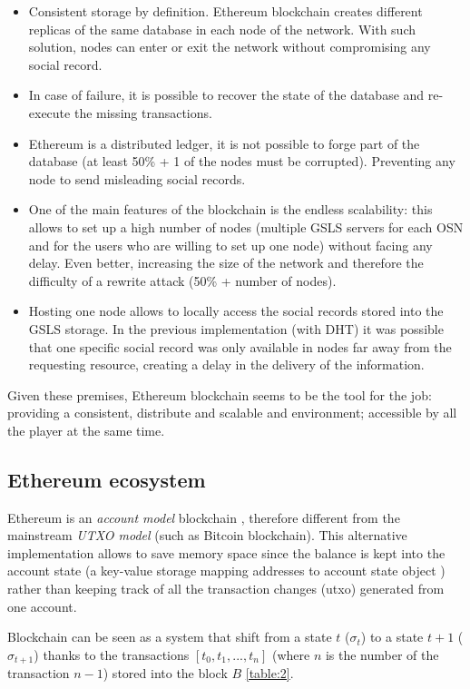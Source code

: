 \begin{itemize}
  \item Consistent storage by definition. Ethereum blockchain creates different replicas of the same database in each node of the network. With such solution, nodes can enter or exit the network without compromising any social record.
  \item In case of failure, it is possible to recover the state of the database and re-execute the missing transactions.
  \item Ethereum is a distributed ledger, it is not possible to forge part of the database (at least 50\% + 1 of the nodes must be corrupted). Preventing any node to send misleading social records.
  \item One of the main features of the blockchain is the endless scalability: this allows to set up a high number of nodes (multiple GSLS servers for each OSN and for the users who are willing to set up one node) without facing any delay.
  Even better, increasing the size of the network and therefore the difficulty of a rewrite attack (50\% + number of nodes).
  \item Hosting one node allows to locally access the social records stored into the GSLS storage. In the previous implementation (with DHT) it was possible that one specific social record was only available in nodes far away from the requesting resource, creating a delay in the delivery of the information. 
\end{itemize}

Given these premises, Ethereum blockchain seems to be the tool for the job: providing a consistent, distribute and scalable and environment; accessible by all the player at the same time.


\subsection{Ethereum ecosystem}
\label{ethereumEcosystem:1}

Ethereum is an \textit{account model} blockchain \cite{ethereum_whitepaper}, therefore different from the mainstream \textit{UTXO model}  (such as Bitcoin blockchain). This alternative implementation allows to save memory space since the balance is kept into the account state (a key-value storage mapping addresses to account state object \cite{ethereum_yellowpaper}) rather than keeping track of all the transaction changes (utxo) generated from one account.

Blockchain can be seen as a system that shift from a state $t$ ($\sigma_t$) to a state $t+1$ ($\sigma_{t+1}$) thanks to the transactions $[t_0,t_1,...,t_n]$ (where $n$ is the number of the transaction $n-1$) stored into the block $B$ \ref{table:2}.


